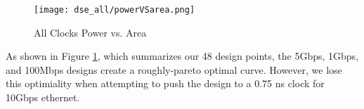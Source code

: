 \begin{figure}
    \begin{center}
        \texttt{[image: dse\_all/powerVSarea.png]}
        \caption{All Clocks Power vs. Area}
        \label{fig:all-pva}
    \end{center}
\end{figure}

As shown in Figure \ref{fig:all-pva}, which summarizes our 48 design points,
the 5Gbps, 1Gbps, and 100Mbps designs create a roughly-pareto optimal curve.
However, we lose this optimiality when attempting to push the design to a
0.75 ns clock for 10Gbps ethernet.


